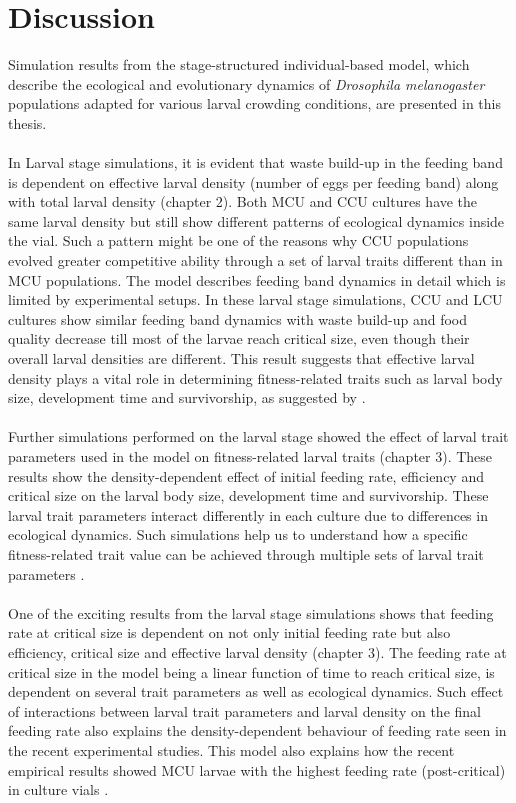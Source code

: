 \chapter{Discussion}
Simulation results from the stage-structured individual-based model, which describe the ecological and evolutionary dynamics of \textit{Drosophila melanogaster} populations adapted for various larval crowding conditions, are presented in this thesis.\\\\
In Larval stage simulations, it is evident that waste build-up in the feeding band is dependent on effective larval density (number of eggs per feeding band) along with total larval density (chapter 2). Both MCU and CCU cultures have the same larval density but still show different patterns of ecological dynamics inside the vial. Such a pattern might be one of the reasons why CCU populations evolved greater competitive ability through a set of larval traits different than in MCU populations. The model describes feeding band dynamics in detail which is limited by experimental setups. In these larval stage simulations, CCU and LCU cultures show similar feeding band dynamics with waste build-up and food quality decrease till most of the larvae reach critical size, even though their overall larval densities are different. This result suggests that effective larval density plays a vital role in determining fitness-related traits such as larval body size, development time and survivorship, as suggested by \citep{sarangiEcologicalDetailsMediate2018}.\\\\
Further simulations performed on the larval stage showed the effect of larval trait parameters used in the model on fitness-related larval traits (chapter 3). These results show the density-dependent effect of initial feeding rate, efficiency and critical size on the larval body size, development time and survivorship. These larval trait parameters interact differently in each culture due to differences in ecological dynamics. Such simulations help us to understand how a specific fitness-related trait value can be achieved through multiple sets of larval trait parameters \citep{sarangiEvolutionIncreasedLarval2016}.\\\\
One of the exciting results from the larval stage simulations shows that feeding rate at critical size is dependent on not only initial feeding rate but also efficiency, critical size and effective larval density (chapter 3). The feeding rate at critical size in the model being a linear function of time to reach critical size, is dependent on several trait parameters as well as ecological dynamics. Such effect of interactions between larval trait parameters and larval density on the final feeding rate also explains the density-dependent behaviour of feeding rate seen in the recent experimental studies. This model also explains how the recent empirical results showed MCU larvae with the highest feeding rate (post-critical) in culture vials \citep{sarangiEcologicalDetailsMediate2018}.\\\\
